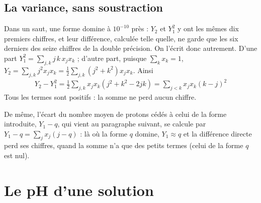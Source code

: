 \documentclass[a4paper,11pt]{article}
\newcommand\rsltm[1]{\boxed{#1}}
\newcommand\pare[1]{\left(#1\right)}
\begin{document}
\subsection{La variance, sans soustraction}
\begin{algo}
Dans un saut, une forme domine à $10^{-10}$ près : $Y_2$ et $Y_1^2$ y ont les mêmes dix premiers chiffres, et leur différence, calculée telle quelle, ne garde que les six derniers des seize chiffres de la double précision.
On l'écrit donc autrement.
D'une part $Y_1^2=\sum_{j,k}j\,k\,x_jx_k$ ; d'autre part, puisque $\sum_kx_k=1$, $Y_2=\sum_{j,k}j^2x_jx_k=\frac12\sum_{j,k}\pare{j^2+k^2}x_jx_k$.
Ainsi
\begin{align}
Y_2-Y_1^2
=\frac12\sum_{j,k}x_jx_k\pare{j^2+k^2-2jk}
=\rsltm{\sum_{j<k}x_jx_k\pare{k-j}^2}
\label{eq:variance}
\end{align}
Tous les termes sont positifs : la somme ne perd aucun chiffre.

De même, l'écart du nombre moyen de protons cédés à celui de la forme introduite, $Y_1-q$, qui vient au paragraphe suivant, se calcule par $Y_1-q=\sum_jx_j\pare{j-q}$ : là où la forme $q$ domine, $Y_1\approx q$ et la différence directe perd ses chiffres, quand la somme n'a que des petits termes (celui de la forme $q$ est nul).
\end{algo}

\section{Le pH d'une solution}\label{sec:pH}
\end{document}
